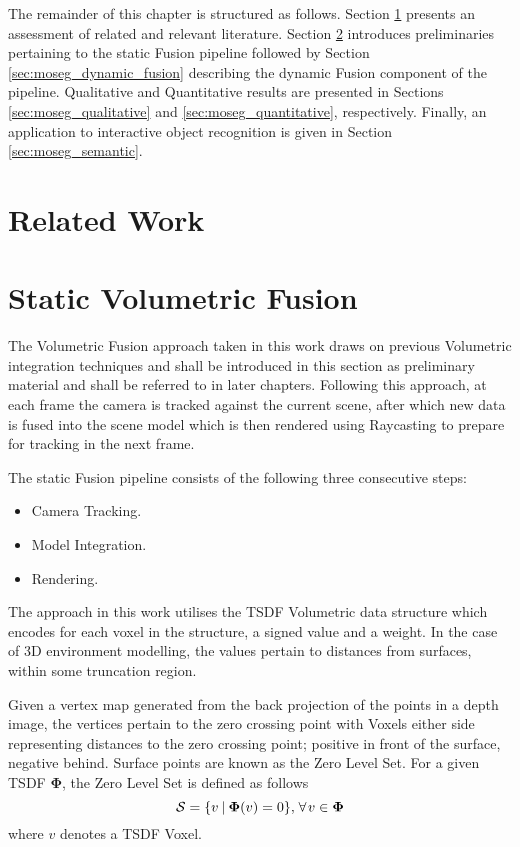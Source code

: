 The remainder of this chapter is structured as follows.
Section \ref{sec:moseg_related_work} presents an assessment of related and
relevant literature. Section \ref{sec:moseg_static_fusion} introduces
preliminaries pertaining to the static Fusion pipeline followed by Section
\ref{sec:moseg_dynamic_fusion} describing the dynamic Fusion component of the
pipeline. Qualitative and Quantitative results are presented in Sections
\ref{sec:moseg_qualitative} and \ref{sec:moseg_quantitative}, respectively.
Finally, an application to interactive object recognition is given in Section
\ref{sec:moseg_semantic}.

\section{Related Work}
\label{sec:moseg_related_work}

\section{Static Volumetric Fusion}
\label{sec:moseg_static_fusion}
The Volumetric Fusion approach taken in this work draws on previous Volumetric
integration techniques \cite{Curless1996, Newcombe2011, NieBner2013, Prisacariu2014}
and shall be introduced in this section as preliminary material and shall be
referred to in later chapters. Following this approach, at each frame the camera
is tracked against the current scene, after which new data is fused into the
scene model which is then rendered using Raycasting to prepare for tracking in
the next frame.

The static Fusion pipeline consists of the following three consecutive steps:
\begin{itemize}
  \item Camera Tracking.
  \item Model Integration.
  \item Rendering.
\end{itemize}

The approach in this work utilises the TSDF Volumetric data structure which
encodes for each voxel in the structure, a signed value and a weight.
In the case of 3D environment modelling, the values pertain to distances from
surfaces, within some truncation region.

Given a vertex map generated from the back projection of the points in a depth
image, the vertices pertain to the zero crossing point with Voxels either side
representing distances to the zero crossing point; positive in front of the
surface, negative behind. Surface points are known as the Zero Level Set.
For a given TSDF $\mathbf{\Phi}$, the Zero Level Set is defined as follows
\begin{equation}
  \label{eqn:zero_level_definition}
  \mathcal{S} = \{v \:\vert\: \mathbf{\Phi}(v) = 0\}, 
  \mkern2mu \forall \mkern2mu v \in \mathbf{\Phi}
\end{equation}
where $v$ denotes a TSDF Voxel.

